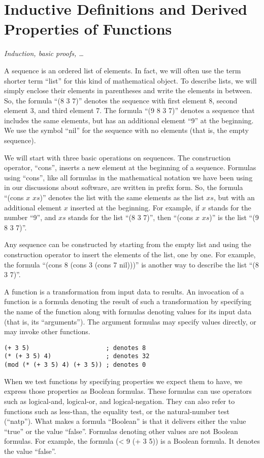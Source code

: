 \chapter{Inductive Definitions and Derived Properties of Functions}

\textit{Induction, basic proofs, \dots}

A sequence is an ordered list of elements. In fact, we will often use the term shorter term ``list'' for this kind of mathematical object. To describe lists, we will simply enclose their elements in parentheses and write the elements in between. So, the formula ``(8 3 7)'' denotes the sequence with first element 8, second element 3, and third element 7. The formula ``(9 8 3 7)'' denotes a sequence that includes the same elements, but has an additional element ``9'' at the beginning. We use the symbol ``nil'' for the sequence with no elements (that is, the empty sequence).

We will start with three basic operations on sequences. The construction operator, ``cons'', inserts a new element at the beginning of a sequence. Formulas using ``cons'', like all formulas in the mathematical notation we have been using in our discussions about software, are written in prefix form. So, the formula ``(cons $x$ $xs$)'' denotes the list with the same elements as the list $xs$, but with an additional element $x$ inserted at the beginning. For example, if $x$ stands for the number ``9'', and $xs$ stands for the list ``(8 3 7)'', then ``(cons $x$ $xs$)'' is the list ``(9 8 3 7)''.

Any sequence can be constructed by starting from the empty list and using the construction operator to insert the elements of the list, one by one. For example, the formula ``(cons 8 (cons 3 (cons 7 nil)))'' is another way to describe the list ``(8 3 7)''.

A function is a transformation from input data to results. An invocation of a function is a formula denoting the result of such a transformation by specifying the name of the function along with formulas denoting values for its input data (that is, its ``arguments''). The argument formulas may specify values directly, or may invoke other functions.

\begin{lstlisting}
(+ 3 5)                     ; denotes 8
(* (+ 3 5) 4)               ; denotes 32
(mod (* (+ 3 5) 4) (+ 3 5)) ; denotes 0
\end{lstlisting}

When we test functions by specifying properties we expect them to have, we express those properties
as Boolean formulas. These formulas can use operators such as logical-and, logical-or, and logical-negation. They can also refer to functions such as less-than, the equality test, or the natural-number test (``natp''). What makes a formula ``Boolean'' is that it delivers either the value ``true'' or the value ``false''. Formulas denoting other values are not Boolean formulas. For example, the formula (< 9 (+ 3 5)) is a Boolean formula. It denotes the value ``false''.

